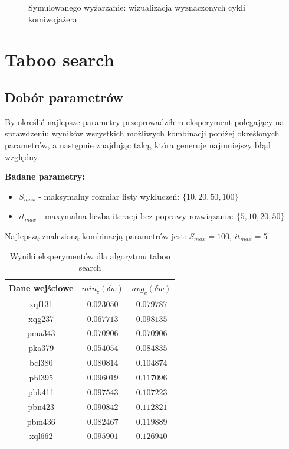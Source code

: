 \documentclass[12pt]{article}
\begin{document}
\begin{figure}[htpb]
\begin{subfigure}[b]{0.475\textwidth}
            \end{subfigure}
            \caption{Symulowanego wyżarzanie: wizualizacja wyznaczonych cykli komiwojażera}
        \end{figure}

    \newpage

\section{Taboo search}
    \subsection{Dobór parametrów}
        By określić najlepsze parametry przeprowadziłem eksperyment polegający na sprawdzeniu wyników
        wszystkich możliwych kombinacji poniżej określonych parametrów, a następnie znajdując taką,
        która generuje najmniejszy błąd względny.
        \newline

        \noindent \textbf{Badane parametry:}
        \begin{itemize}
            \item $S_{max}$ - maksymalny rozmiar listy wykluczeń: $\{10, 20, 50, 100\}$
            \item $it_{max}$ - maxymalna liczba iteracji bez poprawy rozwiązania: $\{5, 10, 20, 50\}$
        \end{itemize}

        \noindent\newline Najlepszą znalezioną kombinacją parametrów jest: $S_{max} = 100$, $it_{max} = 5$

        \begin{table}[h!]
        \centering
        \begin{tabularx}{0.4225\textwidth}{| c | c | c |}
            \hline
            Dane wejściowe & $min_{c}(\delta{w})$ & $avg_{c}(\delta{w})$ \\
            \hline
            xqf131 & $0.023050$ & $0.079787$ \\
            xqg237 & $0.067713$ & $0.098135$ \\
            pma343 & $0.070906$ & $0.070906$ \\
            pka379 & $0.054054$ & $0.084835$ \\
            bcl380 & $0.080814$ & $0.104874$ \\
            pbl395 & $0.096019$ & $0.117096$ \\
            pbk411 & $0.097543$ & $0.107223$ \\
            pbn423 & $0.090842$ & $0.112821$ \\
            pbm436 & $0.082467$ & $0.119889$ \\
            xql662 & $0.095901$ & $0.126940$ \\
            \hline
        \end{tabularx}
        \label{table:ts_exp}
        \caption{Wyniki eksperymentów dla algorytmu taboo search}
        \end{table}
\end{document}
